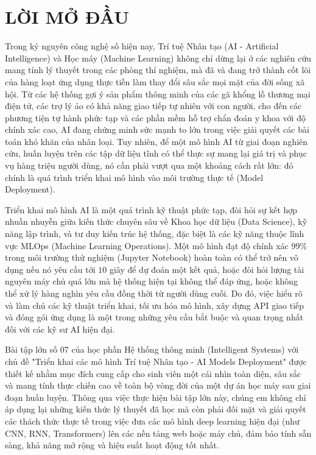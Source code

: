 \section*{LỜI MỞ ĐẦU}

Trong kỷ nguyên công nghệ số hiện nay, Trí tuệ Nhân tạo (AI - Artificial Intelligence) và Học máy (Machine Learning) không chỉ dừng lại ở các nghiên cứu mang tính lý thuyết trong các phòng thí nghiệm, mà đã và đang trở thành cốt lõi của hàng loạt ứng dụng thực tiễn làm thay đổi sâu sắc mọi mặt của đời sống xã hội. Từ các hệ thống gợi ý sản phẩm thông minh của các gã khổng lồ thương mại điện tử, các trợ lý ảo có khả năng giao tiếp tự nhiên với con người, cho đến các phương tiện tự hành phức tạp và các phần mềm hỗ trợ chẩn đoán y khoa với độ chính xác cao, AI đang chứng minh sức mạnh to lớn trong việc giải quyết các bài toán khó khăn của nhân loại. Tuy nhiên, để một mô hình AI từ giai đoạn nghiên cứu, huấn luyện trên các tập dữ liệu tĩnh có thể thực sự mang lại giá trị và phục vụ hàng triệu người dùng, nó cần phải vượt qua một khoảng cách rất lớn: đó chính là quá trình triển khai mô hình vào môi trường thực tế (Model Deployment).

Triển khai mô hình AI là một quá trình kỹ thuật phức tạp, đòi hỏi sự kết hợp nhuần nhuyễn giữa kiến thức chuyên sâu về Khoa học dữ liệu (Data Science), kỹ năng lập trình, và tư duy kiến trúc hệ thống, đặc biệt là các kỹ năng thuộc lĩnh vực MLOps (Machine Learning Operations). Một mô hình đạt độ chính xác $99\%$ trong môi trường thử nghiệm (Jupyter Notebook) hoàn toàn có thể trở nên vô dụng nếu nó yêu cầu tới $10$ giây để dự đoán một kết quả, hoặc đòi hỏi lượng tài nguyên máy chủ quá lớn mà hệ thống hiện tại không thể đáp ứng, hoặc không thể xử lý hàng nghìn yêu cầu đồng thời từ người dùng cuối. Do đó, việc hiểu rõ và làm chủ các kỹ thuật triển khai, tối ưu hóa mô hình, xây dựng API giao tiếp và đóng gói ứng dụng là một trong những yêu cầu bắt buộc và quan trọng nhất đối với các kỹ sư AI hiện đại.

Bài tập lớn số 07 của học phần Hệ thống thông minh (Intelligent Systems) với chủ đề "Triển khai các mô hình Trí tuệ Nhân tạo - AI Models Deployment" được thiết kế nhằm mục đích cung cấp cho sinh viên một cái nhìn toàn diện, sâu sắc và mang tính thực chiến cao về toàn bộ vòng đời của một dự án học máy sau giai đoạn huấn luyện. Thông qua việc thực hiện bài tập lớn này, chúng em không chỉ áp dụng lại những kiến thức lý thuyết đã học mà còn phải đối mặt và giải quyết các thách thức thực tế trong việc đưa các mô hình deep learning hiện đại (như CNN, RNN, Transformers) lên các nền tảng web hoặc máy chủ, đảm bảo tính sẵn sàng, khả năng mở rộng và hiệu suất hoạt động tốt nhất.

